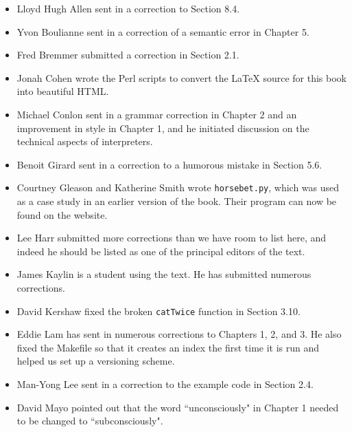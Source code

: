 \documentclass[10pt]{book}
\begin{document}
\small

\begin{itemize}

\item Lloyd Hugh Allen sent in a correction to Section 8.4.

\item Yvon Boulianne sent in a correction of a semantic error in
Chapter 5.

\item Fred Bremmer submitted a correction in Section 2.1.

\item Jonah Cohen wrote the Perl scripts to convert the
LaTeX source for this book into beautiful HTML.

\item Michael Conlon sent in a grammar correction in Chapter 2
and an improvement in style in Chapter 1, and he initiated discussion
on the technical aspects of interpreters.

\item Benoit Girard sent in a
correction to a humorous mistake in Section 5.6.

\item Courtney Gleason and Katherine Smith wrote {\tt horsebet.py},
which was used as a case study in an earlier version of the book.  Their
program can now be found on the website.

\item Lee Harr submitted more corrections than we have room to list
here, and indeed he should be listed as one of the principal editors
of the text.

\item James Kaylin is a student using the text. He has submitted
numerous corrections.

\item David Kershaw fixed the broken {\tt catTwice} function in Section
3.10.

\item Eddie Lam has sent in numerous corrections to Chapters 
1, 2, and 3.
He also fixed the Makefile so that it creates an index the first time it is
run and helped us set up a versioning scheme.  

\item Man-Yong Lee sent in a correction to the example code in
Section 2.4.  

\item David Mayo pointed out that the word ``unconsciously"
in Chapter 1 needed
to be changed to ``subconsciously".


\end{itemize}
\end{document}
